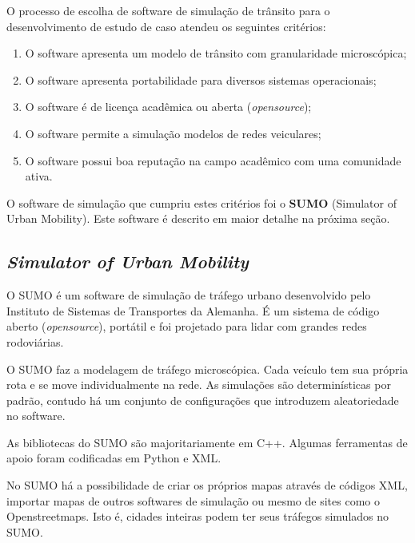 \documentclass[
12pt,				%
openright,			%
oneside,			%
a4paper,			%
brazil,				%
]{abntex2}
\begin{document}
	\par O processo de escolha de software de simulação de trânsito para o desenvolvimento de estudo de caso atendeu os seguintes critérios:
	
	\begin{enumerate}
		\item O software apresenta um modelo de trânsito com granularidade microscópica;
		\item O software apresenta portabilidade para diversos sistemas operacionais;
		\item O software é de licença acadêmica ou aberta (\textit{opensource});
		\item O software permite a simulação modelos de redes veiculares;
		\item O software possui boa reputação na campo acadêmico com uma comunidade ativa.		
	\end{enumerate}

	\par O software de simulação que cumpriu estes critérios foi o \textbf{SUMO} (Simulator of Urban Mobility). Este software é descrito em maior detalhe na próxima seção.
	
	\subsection{\textit{Simulator of Urban Mobility}}
	
	\par O SUMO é um software de simulação de tráfego urbano desenvolvido pelo Instituto de Sistemas de Transportes da Alemanha. É um sistema de código aberto (\textit{opensource}), portátil e foi projetado para lidar com grandes redes rodoviárias.
	
	\par O SUMO faz a modelagem de tráfego microscópica. Cada veículo tem sua própria rota e se move individualmente na rede. As simulações são determinísticas por padrão, contudo há um conjunto de configurações que introduzem aleatoriedade no software.
	
	\par As bibliotecas do SUMO são majoritariamente em C++. Algumas ferramentas de apoio foram codificadas em Python e XML.
	
	\par No SUMO há a possibilidade de criar os próprios mapas através de códigos XML, importar mapas de outros softwares de simulação ou mesmo de sites como o Openstreetmaps. Isto é, cidades inteiras podem ter seus tráfegos simulados no SUMO.
	
\end{document}
